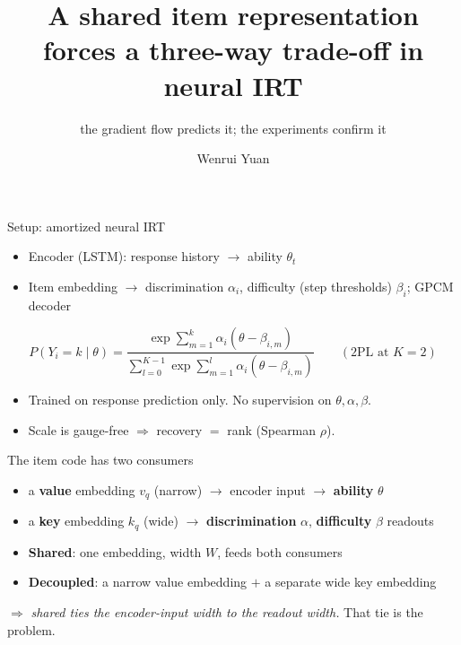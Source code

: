 \documentclass[aspectratio=169]{beamer}
\title[A shared item code forces a three-way trade-off]{A shared item representation forces a three-way trade-off in neural IRT}
\subtitle{the gradient flow predicts it; the experiments confirm it}
\author{Wenrui Yuan}
\date{}
\begin{document}
\begin{frame}\titlepage\end{frame}

\begin{frame}{Setup: amortized neural IRT}
\begin{itemize}
\item Encoder (LSTM): response history $\to$ ability $\theta_t$
\item Item embedding $\to$ discrimination $\alpha_i$, difficulty (step thresholds) $\beta_i$; GPCM decoder
\end{itemize}
\[
  P(Y_i=k\mid\theta)=\frac{\exp\sum_{m=1}^{k}\alpha_i(\theta-\beta_{i,m})}
       {\sum_{l=0}^{K-1}\exp\sum_{m=1}^{l}\alpha_i(\theta-\beta_{i,m})}
  \qquad(\text{2PL at }K{=}2)
\]
\begin{itemize}
\item Trained on response prediction only. No supervision on $\theta,\alpha,\beta$.
\item Scale is gauge-free $\Rightarrow$ recovery $=$ rank (Spearman $\rho$).
\end{itemize}
\end{frame}

\begin{frame}{The item code has two consumers}
\begin{itemize}
\item a \textbf{value} embedding $v_q$ (narrow) $\to$ encoder input $\to$ \textbf{ability} $\theta$
\item a \textbf{key} embedding $k_q$ (wide) $\to$ \textbf{discrimination} $\alpha$, \textbf{difficulty} $\beta$ readouts
\end{itemize}
\medskip
\begin{itemize}
\item \textbf{Shared}: one embedding, width $W$, feeds both consumers
\item \textbf{Decoupled}: a narrow value embedding $+$ a separate wide key embedding
\end{itemize}
\medskip
\centering
$\Rightarrow$ \emph{shared ties the encoder-input width to the readout width.} That tie is the problem.
\end{frame}
\end{document}
